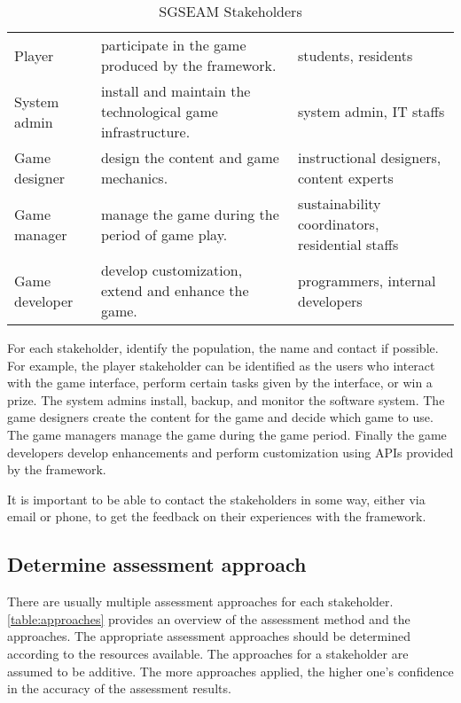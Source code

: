 \begin{table}[ht!]
  \centering
  \begin{tabular}{|p{}|P{0.42\columnwidth}|P{0.28\columnwidth}|}
    \hline
     &
     &
     \\
    \hline
    Player &
    participate in the game produced by the framework. &
    students, residents \\
    \hline
    System admin &
    install and maintain the technological game infrastructure. &
    system admin, IT staffs \\
    \hline
    Game designer &
    design the content and game mechanics. &
    instructional designers, content experts \\
    \hline
    Game manager &
    manage the game during the period of game play.&
    sustainability coordinators, residential staffs\\
    \hline
    Game developer &
    develop customization, extend and enhance the game. &
    programmers, internal developers \\
    \hline
  \end{tabular}
  \caption{SGSEAM Stakeholders}
  \label{table:stakeholders}
\end{table}

For each stakeholder, identify the population, the name and contact if possible. For example, the 
player stakeholder can be identified as the users who interact with the game interface, perform certain tasks given by the interface, or win a prize. The system admins install, backup, and monitor the software system. The game designers create the content for the game and decide which game to use. The game managers manage the game during the game period. Finally the game developers develop enhancements and perform customization using APIs provided by the framework.

It is important to be able to contact the stakeholders in some way, either via email or phone, to get the feedback on their experiences with the framework.

\subsection{Determine assessment approach}

There are usually multiple assessment approaches for each stakeholder.  \autoref{table:approaches} provides 
an overview of the assessment method and the approaches. The appropriate assessment approaches should 
be determined according to the resources available. The approaches for a stakeholder are assumed to be additive. The more 
approaches applied, the higher one's confidence in the accuracy of the assessment results.

